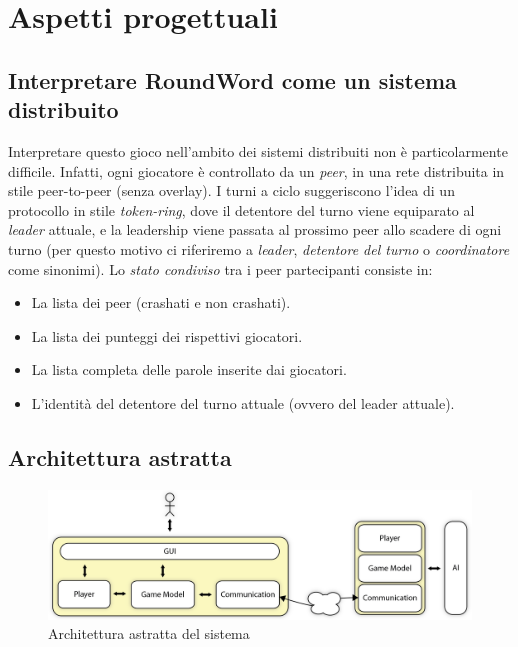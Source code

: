 \documentclass[9pt]{article}
\begin{document}
\section{Aspetti progettuali}

\subsection{Interpretare RoundWord come un sistema distribuito}
Interpretare questo gioco nell'ambito dei sistemi distribuiti non è particolarmente difficile. Infatti, ogni giocatore è controllato da un \emph{peer}, in una rete distribuita in stile peer-to-peer (senza overlay). I turni a ciclo suggeriscono l'idea di un protocollo in stile \emph{token-ring}, dove il detentore del turno viene equiparato al \emph{leader} attuale, e la leadership viene passata al prossimo peer allo scadere di ogni turno (per questo motivo ci riferiremo a \emph{leader}, \emph{detentore del turno} o \emph{coordinatore} come sinonimi). Lo \emph{stato condiviso} tra i peer partecipanti consiste in:
\begin{itemize}
\item La lista dei peer (crashati e non crashati).
\item La lista dei punteggi dei rispettivi giocatori.
\item La lista completa delle parole inserite dai giocatori.
\item L'identità del detentore del turno attuale (ovvero del leader attuale).
\end{itemize}


\subsection{Architettura astratta}

\begin{figure}
\centering
\includegraphics[scale=0.6]{imgs/ArchitetturaAstratta.png}
\caption{Architettura astratta del sistema}
\label{img:architettura-astratta}
\end{figure}
\end{document}
